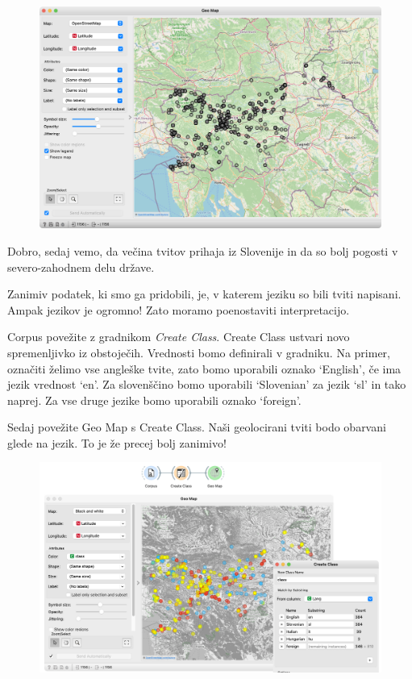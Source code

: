 \begin{figure}[h]
    \includegraphics[width=\linewidth]{geo1.png}%
    \caption{}
    \label{fig:012-geo1}
  \end{figure}

Dobro, sedaj vemo, da večina tvitov prihaja iz Slovenije in da so bolj pogosti v severo-zahodnem delu države.

Zanimiv podatek, ki smo ga pridobili, je, v katerem jeziku so bili tviti napisani. Ampak jezikov je ogromno! Zato moramo poenostaviti interpretacijo.

Corpus povežite z gradnikom \textit{Create Class}. Create Class ustvari novo spremenljivko iz obstoječih. Vrednosti bomo definirali v gradniku. Na primer, označiti želimo vse angleške tvite, zato bomo uporabili oznako ‘English’, če ima jezik vrednost ‘en’. Za slovenščino bomo uporabili ‘Slovenian’ za jezik ‘sl’ in tako naprej. Za vse druge jezike bomo uporabili oznako ‘foreign’.

Sedaj povežite Geo Map s Create Class. Naši geolocirani tviti bodo obarvani glede na jezik. To je že precej bolj zanimivo!

\begin{figure}[h]
    \includegraphics[width=\linewidth]{geo2.png}%
    \caption{}
    \label{fig:012-geo2}
\end{figure}